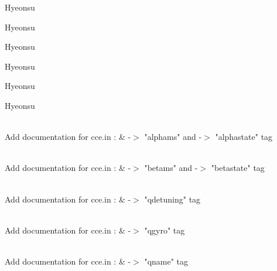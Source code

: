 \begin{DoxyRefList}
\label{todo__todo000037}%
%
Hyeonsu 

\label{todo__todo000038}%
%
Hyeonsu 

\label{todo__todo000039}%
%
Hyeonsu 

\label{todo__todo000040}%
%
Hyeonsu 

\label{todo__todo000041}%
%
Hyeonsu 

\label{todo__todo000042}%
%
Hyeonsu  
\item[Member \doxylink{structQubit_accc3b309d802ab6f269b7d8a7536a4a0}{Qubit\+::alpha} ]\hfill \\
\label{todo__todo000023}%
%
Add documentation for cce.\+in \+: \& -\/\texorpdfstring{$>$}{>} "{}alphams"{} and -\/\texorpdfstring{$>$}{>} "{}alphastate"{} tag  
\item[Member \doxylink{structQubit_a6c73eb8c49fdb6db06179b21b5a2923d}{Qubit\+::beta} ]\hfill \\
\label{todo__todo000024}%
%
Add documentation for cce.\+in \+: \& -\/\texorpdfstring{$>$}{>} "{}betams"{} and -\/\texorpdfstring{$>$}{>} "{}betastate"{} tag  
\item[Member \doxylink{structQubit_a6e0e926587994ef24d67431d0dbef9e7}{Qubit\+::detuning} ]\hfill \\
\label{todo__todo000021}%
%
Add documentation for cce.\+in \+: \& -\/\texorpdfstring{$>$}{>} "{}qdetuning"{} tag  
\item[Member \doxylink{structQubit_a668a62d3ddf72e6b9acbc6338c97090f}{Qubit\+::gyro} ]\hfill \\
\label{todo__todo000019}%
%
Add documentation for cce.\+in \+: \& -\/\texorpdfstring{$>$}{>} "{}qgyro"{} tag  
\item[Member \doxylink{structQubit_ab65a0dfa0efbd8a7862403f4704c1587}{Qubit\+::name} \mbox{[}MAX\+\_\+\+CHARARRAY\+\_\+\+LENGTH\mbox{]}]\hfill \\
\label{todo__todo000017}%
%
Add documentation for cce.\+in \+: \& -\/\texorpdfstring{$>$}{>} "{}qname"{} tag  
\item[Member \doxylink{structQubit_aecb3943042094c4be043f375626dbd24}{Qubit\+::overhaus} ]\hfill \\

\end{DoxyRefList}
